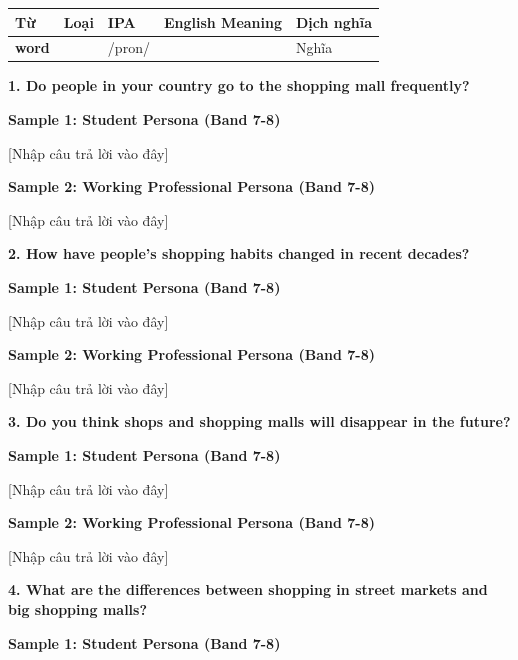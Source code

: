 \vspace{0.8em}
\begin{center}
\renewcommand{\arraystretch}{1.65}
\begin{tabularx}{\textwidth}{|V{0.22\textwidth}|C{0.07\textwidth}|I{0.20\textwidth}|Y|V{0.18\textwidth}|}
\hline
{}
\textbf{Từ} & \textbf{Loại} & \textbf{IPA} & \textbf{English Meaning} & \textbf{Dịch nghĩa} \\
\hline
\textbf{word} & & /pron/ & & Nghĩa \\ \hline
\end{tabularx}
\end{center}

\partthreeheader

\begin{ieltsquestion}
\textbf{1. Do people in your country go to the shopping mall frequently?}
\end{ieltsquestion}
\textbf{Sample 1: Student Persona (Band 7-8)}

[Nhập câu trả lời vào đây]

\textbf{Sample 2: Working Professional Persona (Band 7-8)}

[Nhập câu trả lời vào đây]

\separator

\begin{ieltsquestion}
\textbf{2. How have people's shopping habits changed in recent decades?}
\end{ieltsquestion}
\textbf{Sample 1: Student Persona (Band 7-8)}

[Nhập câu trả lời vào đây]

\textbf{Sample 2: Working Professional Persona (Band 7-8)}

[Nhập câu trả lời vào đây]

\separator

\begin{ieltsquestion}
\textbf{3. Do you think shops and shopping malls will disappear in the future?}
\end{ieltsquestion}
\textbf{Sample 1: Student Persona (Band 7-8)}

[Nhập câu trả lời vào đây]

\textbf{Sample 2: Working Professional Persona (Band 7-8)}

[Nhập câu trả lời vào đây]

\separator

\begin{ieltsquestion}
\textbf{4. What are the differences between shopping in street markets and big shopping malls?}
\end{ieltsquestion}
\textbf{Sample 1: Student Persona (Band 7-8)}

